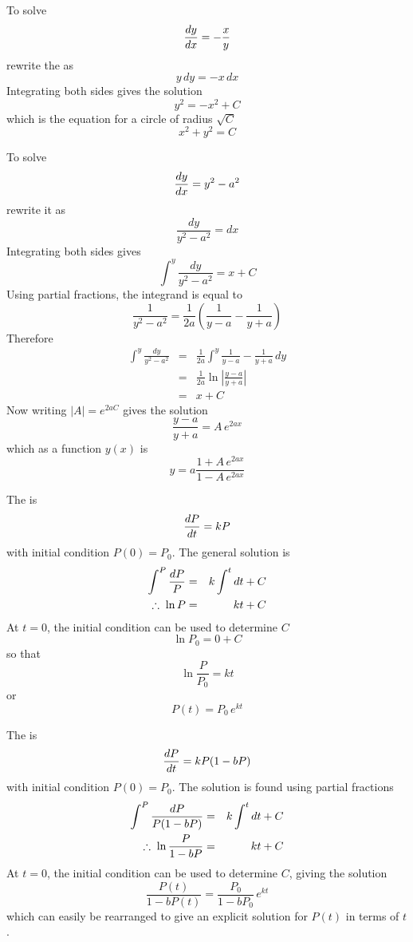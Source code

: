 \begin{example}
To solve
$$\frac{dy}{dx}=-\frac{x}{y}$$
rewrite the \ODE as
$$y\,dy=-x\,dx$$
Integrating both sides gives the solution
$$y^2=-x^2+C$$
which is the equation for a circle of radius $\sqrt{C}$
$$x^2+y^2=C$$
\end{example}

\begin{example}
To solve
$$\frac{dy}{dx}=y^2-a^2$$
rewrite it as
$$\frac{dy}{y^2-a^2}=dx$$
Integrating both sides gives
$$\int^y\frac{dy}{y^2-a^2}=x+C$$
Using partial fractions, the integrand is equal to
$$\frac{1}{y^2-a^2}=\frac{1}{2a}\left(\frac{1}{y-a}-\frac{1}{y+a}\right)$$
Therefore
\begin{eqnarray*}
\int^y\frac{dy}{y^2-a^2}
&=&\frac{1}{2a}\int^y \frac{1}{y-a}-\frac{1}{y+a}\,dy	\\
&=&\frac{1}{2a}\ln\left|\frac{y-a}{y+a}\right|		\\
&=&x+C
\end{eqnarray*}
Now writing $\left|A\right|=e^{2aC}$ gives the solution
$$\frac{y-a}{y+a}=A\,e^{2ax}$$
which as a function $y(x)$ is
$$y=a\frac{1+A\,e^{2ax}}{1-A\,e^{2ax}}$$
\end{example}


\begin{example}
The  is
$$\frac{dP}{dt}=kP$$
with initial condition $P(0)=P_0$.  The general solution is
\begin{eqnarray*}
\int^P\frac{dP}{P}&=&k\int^t dt +C	\\
\;\therefore\;\ln P&=&kt+C
\end{eqnarray*}
At $t=0$, the initial condition can be used to determine $C$
$$\ln P_0=0+C$$
so that
$$\ln\frac{P}{P_0}=kt$$
or
$$P(t)=P_0\,e^{kt}$$
\end{example}

\begin{example}
The  is
$$\frac{dP}{dt}=kP(1-bP)$$
with initial condition $P(0)=P_0$.  The solution is found using partial
fractions
\begin{eqnarray*}
\int^P\frac{dP}{P(1-bP)}&=&k\int^t dt +C	\\
\;\therefore\; \ln \frac{P}{1-bP}&=&kt+C
\end{eqnarray*}
At $t=0$, the initial condition can be used to determine $C$, giving the
solution
$$\frac{P(t)}{1-bP(t)}=\frac{P_0}{1-bP_0}\,e^{kt}$$
which can easily be rearranged to give an explicit solution for $P(t)$ in
terms of $t$.
\end{example}


